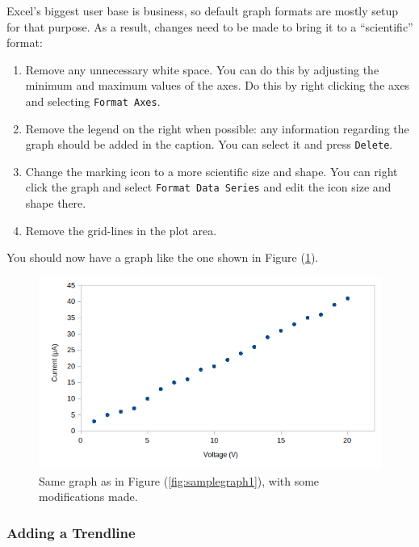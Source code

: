 Excel's biggest user base is business, so default graph formats are mostly setup for that purpose. As a result, changes need to be made to bring it to a ``scientific'' format: \begin{enumerate}
    \item Remove any unnecessary white space. You can do this by adjusting the minimum and maximum values of the axes. Do this by right clicking the axes and selecting \texttt{Format Axes}.
    
    \item Remove the legend on the right when possible: any information regarding the graph should be added in the caption. You can select it and press \texttt{Delete}. 
    
    \item Change the marking icon to a more scientific size and shape. You can right click the graph and select \texttt{Format Data Series} and edit the icon size and shape there.
    
    \item Remove the grid-lines in the plot area.
\end{enumerate}

You should now have a graph like the one shown in Figure (\ref{fig:samplegraph2}).

\begin{figure}[!htb]
    \centering
    \includegraphics[scale=0.8]{figs/samplegraph2.png}
    \caption{Same graph as in Figure (\ref{fig:samplegraph1}), with some modifications made.}
    \label{fig:samplegraph2}
\end{figure}


\subsubsection{Adding a Trendline}

